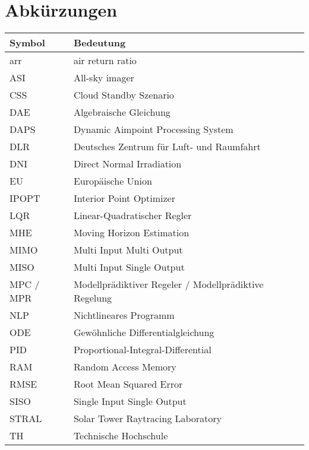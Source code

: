 \section*{Abkürzungen}
\begin{table}[ht!]
    \centering
\begin{tabular}{m{}m{}}
        \rowcolor{white}
Symbol & Bedeutung                                 \\
        \midrule
arr    & air return ratio \\
ASI     & All-sky imager                     \\
CSS     & Cloud Standby Szenario                    \\
DAE     & Algebraische Gleichung                    \\
DAPS     & Dynamic Aimpoint Processing System                     \\
DLR     & Deutsches Zentrum für Luft- und Raumfahrt                    \\
DNI     & Direct Normal Irradiation                     \\
EU     & Europäische Union                     \\
IPOPT     & Interior Point Optimizer                     \\
LQR     & Linear-Quadratischer Regler                    \\
MHE     & Moving Horizon Estimation                     \\
MIMO     & Multi Input Multi Output                     \\
MISO     & Multi Input Single Output                     \\
MPC / MPR     & Modellprädiktiver Regeler / Modellprädiktive Regelung                     \\
NLP     & Nichtlineares Programm                     \\
ODE     & Gewöhnliche Differentialgleichung                     \\
PID     & Proportional-Integral-Differential                     \\
RAM     & Random Access Memory                     \\
RMSE     & Root Mean Squared Error                     \\
SISO     & Single Input Single Output                     \\
STRAL     & Solar Tower Raytracing Laboratory                     \\
TH     & Technische Hochschule                     \\
    \end{tabular}
\end{table}
\clearpage
\newpage

